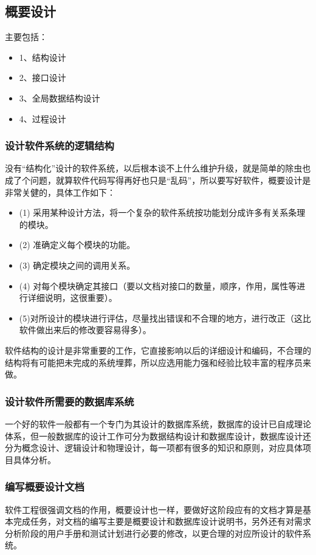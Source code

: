 \documentclass[UTF8,nofonts]{ctexart}
\begin{document}
\subsection{\textbf{概要设计}}
主要包括：
\begin{itemize}
 \setlength{\itemsep}{0pt}
 \setlength{\parskip}{0pt}
 \setlength{\parsep}{0pt}
\item 1、结构设计
\item 2、接口设计
\item	3、全局数据结构设计
\item 4、过程设计
\end{itemize}
\subsubsection{\textbf{设计软件系统的逻辑结构}}
没有“结构化”设计的软件系统，以后根本谈不上什么维护升级，就是简单的除虫也成了个问题，就算软件代码写得再好也只是“乱码”，所以要写好软件，概要设计是非常关健的，具体工作如下：
\begin{itemize}
 \setlength{\itemsep}{0pt}
 \setlength{\parskip}{0pt}
 \setlength{\parsep}{0pt}
\item (1) 采用某种设计方法，将一个复杂的软件系统按功能划分成许多有关系条理的模块。
\item (2) 准确定义每个模块的功能。
\item (3) 确定模块之间的调用关系。
\item (4) 对每个模块确定其接口（要以文档对接口的数量，顺序，作用，属性等进行详细说明，这很重要）。
\item (5)对所设计的模块进行评估，尽量找出错误和不合理的地方，进行改正（这比软件做出来后的修改要容易得多）。
\end{itemize}
软件结构的设计是非常重要的工作，它直接影响以后的详细设计和编码，不合理的结构将有可能把未完成的系统埋葬，所以应选用能力强和经验比较丰富的程序员来做。
\subsubsection{\textbf{设计软件所需要的数据库系统}}
一个好的软件一般都有一个专门为其设计的数据库系统，数据库的设计已自成理论体系，但一般数据库的设计工作可分为数据结构设计和数据库设计，数据库设计还分为概念设计、逻辑设计和物理设计，每一项都有很多的知识和原则，对应具体项目具体分析。		
\subsubsection{\textbf{编写概要设计文档}}
软件工程很强调文档的作用，概要设计也一样，要做好这阶段应有的文档才算是基本完成任务，对文档的编写主要是概要设计和数据库设计说明书，另外还有对需求分析阶段的用户手册和测试计划进行必要的修改，以更合理的对应所设计的软件系统。
\end{document}
